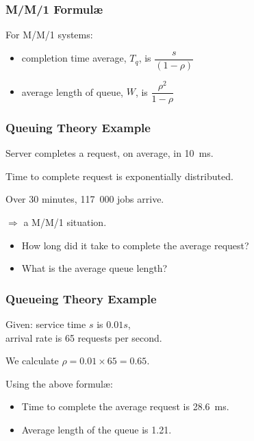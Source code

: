 \begin{frame}
\frametitle{M/M/1 Formul\ae}

\large
\begin{changemargin}{1.5cm}
For M/M/1 systems: \\[0em]

\begin{itemize}
\item completion time average, $T_{q}$, is $\dfrac{s}{(1-\rho)}$
\item average length of queue, $W$, is $\dfrac{\rho^{2}}{1-\rho}$
\end{itemize}
\end{changemargin}
\end{frame}



\begin{frame}
\frametitle{Queuing Theory Example}

\large
\begin{changemargin}{1.5cm}
Server completes a request, on average, in 10~ms. 

Time to complete request is exponentially distributed. 

Over 30 minutes, 117~000 jobs arrive. 

$\Longrightarrow$ a M/M/1 situation. 

\begin{itemize}
\item How long did it take to complete the average request? 

\item What is the average queue length?
\end{itemize}
\end{changemargin}

\end{frame}



\begin{frame}
\frametitle{Queueing Theory Example}

\large
\begin{changemargin}{1.5cm}
Given: service time $s$ is $0.01s$, \\
arrival rate is 65 requests per second. 

We calculate $\rho = 0.01 \times 65 = 0.65$. 

Using the above formul\ae:

\begin{itemize}
\item Time to complete the average request is 28.6~ms. 

\item Average length of the queue is 1.21.
\end{itemize}
\end{changemargin}
\end{frame}



